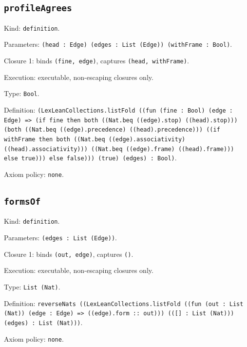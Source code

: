 \documentclass[11pt]{article}
\begin{document}
\subsection*{\texttt{profileAgrees}}
\noindent Kind: \texttt{definition}.\par
\noindent Parameters: \texttt{(head : Edge) (edges : List (Edge)) (withFrame : Bool)}.\par
\noindent Closure 1: binds \texttt{(fine, edge)}, captures \texttt{(head, withFrame)}.\par
\noindent Execution: executable, non-escaping closures only.\par
\noindent Type: \texttt{Bool}.\par
\noindent Definition: \texttt{(LexLeanCollections.listFold ((fun (fine : Bool) (edge : Edge) => (if fine then both ((Nat.beq ((edge).stop) ((head).stop))) (both ((Nat.beq ((edge).precedence) ((head).precedence))) ((if withFrame then both ((Nat.beq ((edge).associativity) ((head).associativity))) ((Nat.beq ((edge).frame) ((head).frame))) else true))) else false))) (true) (edges) : Bool)}.\par
\noindent Axiom policy: \texttt{none}.\par
\subsection*{\texttt{formsOf}}
\noindent Kind: \texttt{definition}.\par
\noindent Parameters: \texttt{(edges : List (Edge))}.\par
\noindent Closure 1: binds \texttt{(out, edge)}, captures \texttt{()}.\par
\noindent Execution: executable, non-escaping closures only.\par
\noindent Type: \texttt{List (Nat)}.\par
\noindent Definition: \texttt{reverseNats ((LexLeanCollections.listFold ((fun (out : List (Nat)) (edge : Edge) => ((edge).form :: out))) (([] : List (Nat))) (edges) : List (Nat)))}.\par
\noindent Axiom policy: \texttt{none}.\par
\end{document}
